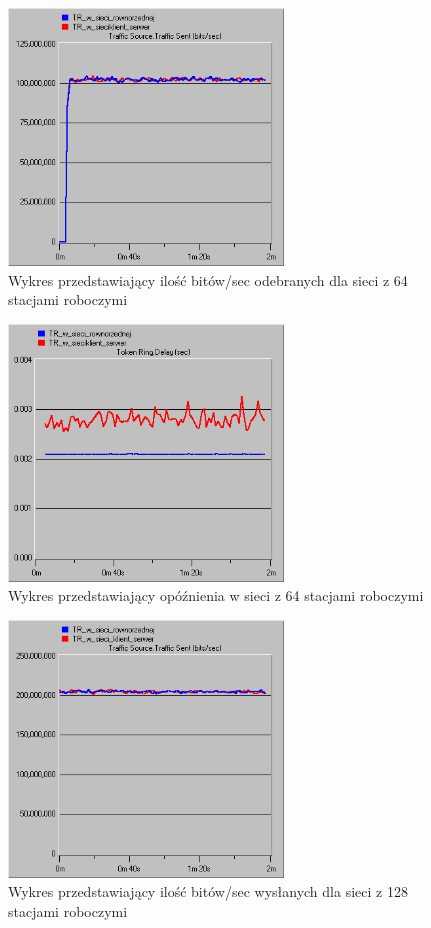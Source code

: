 \documentclass{article}
\begin{document}
\begin{figure}[H]
  \centering
  \includegraphics[width=0.65\textwidth]{screens/64_recv.png}
 \caption{Wykres przedstawiający ilość bitów/sec odebranych dla sieci z 64 stacjami roboczymi}
 \label{fig:64r}
\end{figure}

\begin{figure}[H]
  \centering
  \includegraphics[width=0.65\textwidth]{screens/64_delay.png}
 \caption{Wykres przedstawiający opóźnienia w sieci z 64 stacjami roboczymi}
 \label{fig:64d}
\end{figure}

\begin{figure}[H]
  \centering
  \includegraphics[width=0.65\textwidth]{screens/128_sent.png}
 \caption{Wykres przedstawiający ilość bitów/sec wysłanych dla sieci z 128 stacjami roboczymi}
 \label{fig:128s}
\end{figure}
\end{document}
